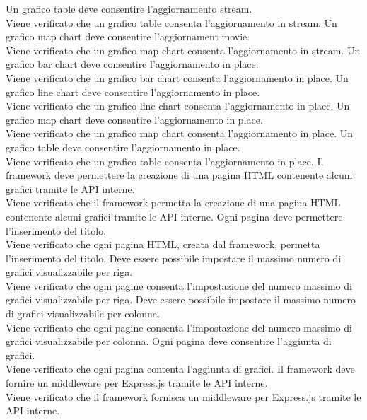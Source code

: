  Un grafico table deve consentire l'aggiornamento stream.\\
Viene verificato che un grafico table consenta l'aggiornamento in stream.
 Un grafico map chart deve consentire l'aggiornament movie.\\
Viene verificato che un grafico map chart consenta l'aggiornamento in stream.
 Un grafico bar chart deve consentire l'aggiornamento in place.\\
Viene verificato che un grafico bar chart consenta l'aggiornamento in place.
 Un grafico line chart deve consentire l'aggiornamento in place.\\
Viene verificato che un grafico line chart consenta l'aggiornamento in place.
 Un grafico map chart deve consentire l'aggiornamento in place.\\
Viene verificato che un grafico map chart consenta l'aggiornamento in place.
 Un grafico table deve consentire l'aggiornamento in place.\\
Viene verificato che un grafico table consenta l'aggiornamento in place.
 Il framework deve permettere la creazione di una pagina HTML contenente alcuni grafici tramite le API interne.\\
Viene verificato che il framework permetta la creazione di una pagina HTML contenente alcuni grafici tramite le API interne.
 Ogni pagina deve permettere l'inserimento del titolo.\\
Viene verificato che ogni pagina HTML, creata dal framework, permetta l'inserimento del titolo.
 Deve essere possibile impostare il massimo numero di grafici visualizzabile per riga.\\
Viene verificato che ogni pagine consenta l'impostazione del numero massimo di grafici visualizzabile per riga.
 Deve essere possibile impostare il massimo numero di grafici visualizzabile per colonna.\\
Viene verificato che ogni pagine consenta l'impostazione del numero massimo di grafici visualizzabile per colonna.
 Ogni pagina deve consentire l'aggiunta di grafici.\\
Viene verificato che ogni pagina contenta l'aggiunta di grafici.
 Il framework deve fornire un middleware per Express.js tramite le API interne.\\
Viene verificato che il framework fornisca un middleware per Express.js tramite le API interne.
